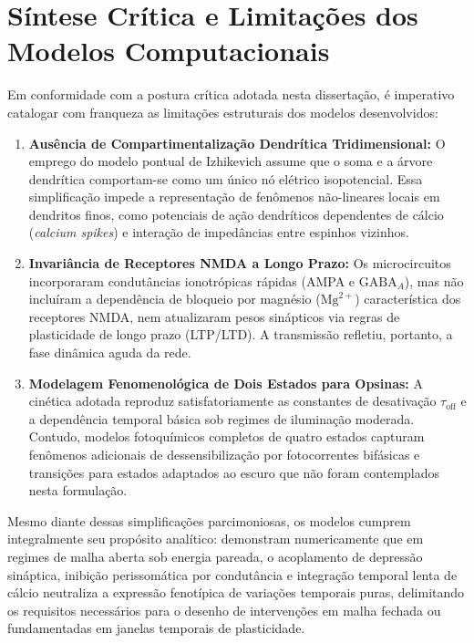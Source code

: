 \documentclass[12pt,openright,oneside,a4paper,brazil]{abntex2}
\begin{document}
\section{Síntese Crítica e Limitações dos Modelos Computacionais}

Em conformidade com a postura crítica adotada nesta dissertação, é imperativo catalogar com franqueza as limitações estruturais dos modelos desenvolvidos:
\begin{enumerate}
    \item \textbf{Ausência de Compartimentalização Dendrítica Tridimensional:} O emprego do modelo pontual de Izhikevich assume que o soma e a árvore dendrítica comportam-se como um único nó elétrico isopotencial. Essa simplificação impede a representação de fenômenos não-lineares locais em dendritos finos, como potenciais de ação dendríticos dependentes de cálcio (\emph{calcium spikes}) e interação de impedâncias entre espinhos vizinhos.
    \item \textbf{Invariância de Receptores NMDA a Longo Prazo:} Os microcircuitos incorporaram condutâncias ionotrópicas rápidas (AMPA e $\text{GABA}_A$), mas não incluíram a dependência de bloqueio por magnésio ($\text{Mg}^{2+}$) característica dos receptores NMDA, nem atualizaram pesos sinápticos via regras de plasticidade de longo prazo (LTP/LTD). A transmissão refletiu, portanto, a fase dinâmica aguda da rede.
    \item \textbf{Modelagem Fenomenológica de Dois Estados para Opsinas:} A cinética adotada reproduz satisfatoriamente as constantes de desativação $\tau_{\text{off}}$ e a dependência temporal básica sob regimes de iluminação moderada. Contudo, modelos fotoquímicos completos de quatro estados \cite{nikolic2009} capturam fenômenos adicionais de dessensibilização por fotocorrentes bifásicas e transições para estados adaptados ao escuro que não foram contemplados nesta formulação.
\end{enumerate}

Mesmo diante dessas simplificações parcimoniosas, os modelos cumprem integralmente seu propósito analítico: demonstram numericamente que em regimes de malha aberta sob energia pareada, o acoplamento de depressão sináptica, inibição perissomática por condutância e integração temporal lenta de cálcio neutraliza a expressão fenotípica de variações temporais puras, delimitando os requisitos necessários para o desenho de intervenções em malha fechada ou fundamentadas em janelas temporais de plasticidade.
\end{document}
